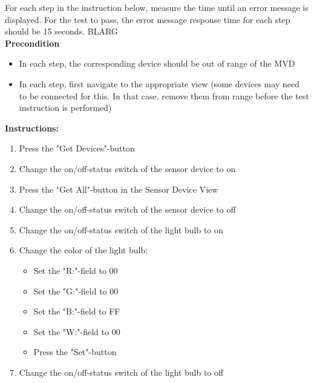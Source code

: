 \documentclass[a4paper]{article}
\newlength{\testlabellength}
\newenvironment{testlist}{\begin{enumerate}[label=\bfseries Instruction \thesubsection.\arabic* , labelindent=0pt, labelwidth=\testlabellength , leftmargin=2cm]}{\end{enumerate}}
\newenvironment{precondition}{
{\color{white}BLARG}\\ 
\textbf{Precondition}
\begin{itemize}[labelindent=0cm, labelwidth=2cm , leftmargin=1cm]
}
{\end{itemize}}
\newenvironment{instruction}{
\textbf{Instructions:}
\begin{enumerate}[label=\bfseries  \arabic*., labelindent=0cm, labelwidth=2cm , leftmargin=1cm]
}
{\end{enumerate}}
\begin{document}
\begin{appendices}
\begin{testlist}
		For each step in the instruction below, measure the time until an error message is displayed. For the test to pass, the error message response time for each step should be 15 seconds.
		\begin{precondition} 
			\item In each step, the corresponding device should be out of range of the MVD
			\item In each step, first navigate to the appropriate view (some devices may need to be connected for this. In that case, remove them from range before the test instruction is performed)
		\end{precondition}
		\begin{instruction}
			\item Press the "Get Devices"-button
			\item Change the on/off-status switch of the sensor device to on
			\item Press the "Get All"-button in the Sensor Device View
			\item Change the on/off-status switch of the sensor device to off
			\item Change the on/off-status switch of the light bulb to on
			\item Change the color of the light bulb:
			\begin{itemize}
				\item Set the "R:"-field to 00
				\item Set the "G:"-field to 00
				\item Set the "B:"-field to FF
				\item Set the "W:"-field to 00
				\item Press the "Set"-button
			\end{itemize}
			\item Change the on/off-status switch of the light bulb to off
		\end{instruction}
	
\end{testlist}

\clearpage

\end{appendices}
\end{document}

